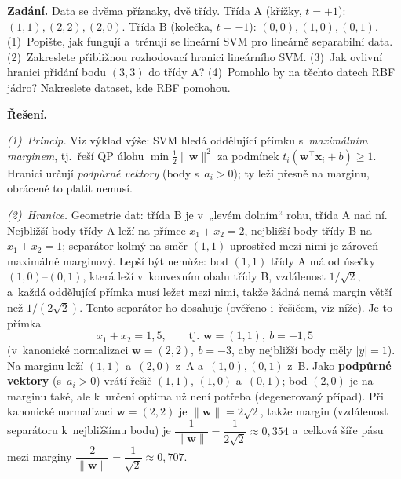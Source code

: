 \begin{priklad}
\par
\textbf{Zadání.} Data se dvěma příznaky, dvě třídy. Třída A (křížky, $t=+1$): $(1,1),(2,2),(2,0)$. Třída B (kolečka, $t=-1$): $(0,0),(1,0),(0,1)$. (1)~Popište, jak fungují a~trénují se lineární SVM pro lineárně separabilní data. (2)~Zakreslete přibližnou rozhodovací hranici lineárního SVM. (3)~Jak ovlivní hranici přidání bodu $(3,3)$ do třídy A? (4)~Pomohlo by na těchto datech RBF jádro? Nakreslete dataset, kde RBF pomohou.

\smallskip
\textbf{Řešení.}

\emph{(1)~Princip.} Viz výklad výše: SVM hledá oddělující přímku s~\emph{maximálním marginem}, tj.\ řeší QP úlohu $\min\tfrac12\|\mathbf{w}\|^2$ za podmínek $t_i(\mathbf{w}^{\!\top}\mathbf{x}_i+b)\ge 1$. Hranici určují \emph{podpůrné vektory} (body s~$a_i>0$); ty leží přesně na marginu, obráceně to platit nemusí.

\emph{(2)~Hranice.} Geometrie dat: třída B je v~„levém dolním`` rohu, třída A nad ní. Nejbližší body třídy A leží na přímce $x_1+x_2=2$, nejbližší body třídy B na $x_1+x_2=1$; separátor kolmý na směr $(1,1)$ uprostřed mezi nimi je zároveň maximálně marginový. Lepší být nemůže: bod $(1,1)$ třídy A má od úsečky $(1,0)$--$(0,1)$, která leží v~konvexním obalu třídy B, vzdálenost $1/\sqrt2$, a~každá oddělující přímka musí ležet mezi nimi, takže žádná nemá margin větší než $1/(2\sqrt2)$. Tento separátor ho dosahuje (ověřeno i~řešičem, viz níže). Je to přímka
\[ \boxed{x_1+x_2 = 1{,}5},\qquad \text{tj.\ } \mathbf{w}=(1,1),\ b=-1{,}5 \]
(v~kanonické normalizaci $\mathbf{w}=(2,2),\ b=-3$, aby nejbližší body měly $|y|=1$). Na marginu leží $(1,1)$ a~$(2,0)$ z~A a~$(1,0),(0,1)$ z~B. Jako \textbf{podpůrné vektory} (s~$a_i>0$) vrátí řešič $(1,1)$, $(1,0)$ a~$(0,1)$; bod $(2,0)$ je na marginu také, ale k~určení optima už není potřeba (degenerovaný případ). Při kanonické normalizaci $\mathbf{w}=(2,2)$ je $\|\mathbf{w}\|=2\sqrt2$, takže margin (vzdálenost separátoru k~nejbližšímu bodu) je $\dfrac{1}{\|\mathbf{w}\|}=\dfrac{1}{2\sqrt2}\approx 0{,}354$ a~celková šíře pásu mezi marginy $\dfrac{2}{\|\mathbf{w}\|}=\dfrac{1}{\sqrt2}\approx 0{,}707$.


\end{priklad}
